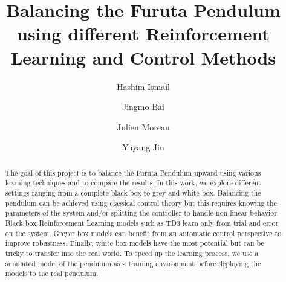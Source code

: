 \documentclass{LTHtwocol} %
\begin{document}
\begin{frontmatter}
\title{Balancing the Furuta Pendulum using different Reinforcement Learning and Control Methods} %

\author[hashim]{Hashim Ismail}
\author[jingmo]{Jingmo Bai}
\author[julien]{Julien Moreau}
\author[yuyang]{Yuyang Jin}



\begin{abstract}
    The goal of this project is to balance the Furuta Pendulum upward using various learning techniques and to compare the results. In this work, we explore different settings ranging from a complete black-box to grey and white-box. Balancing the pendulum can be achieved using classical control theory but this requires knowing the parameters of the system and/or splitting the controller to handle non-linear behavior. Black box Reinforcement Learning models such as TD3 learn only from trial and error on the system. Greyer box models can benefit from an automatic control perspective to improve robustness. Finally, white box models have the most potential but can be tricky to transfer into the real world. To speed up the learning process, we use a simulated model of the pendulum as a training environment before deploying the models to the real pendulum.
\end{abstract}

\end{frontmatter}

\end{document}
